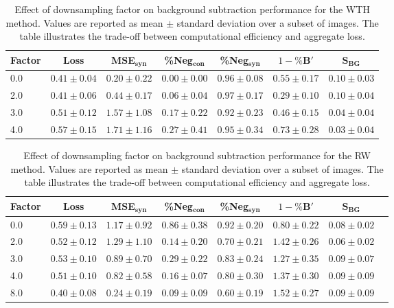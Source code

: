 \begin{table}[h]
\centering
\small
\begin{tabular}{lcccccc}
\hline
Factor & Loss & MSE$_{\mathbf{syn}}$ & \%Neg$_{\mathbf{con}}$ & \%Neg$_{\mathbf{syn}}$ & $1-\%\mathbf{B}'$ & $\mathbf{S}_{\mathbf{BG}}$ \\
\hline
0.0 & $0.41 \pm 0.04$ & $0.20 \pm 0.22$ & $0.00 \pm 0.00$ & $0.96 \pm 0.08$ & $0.55 \pm 0.17$ & $0.10 \pm 0.03$ \\
2.0 & $0.41 \pm 0.06$ & $0.44 \pm 0.17$ & $0.06 \pm 0.04$ & $0.97 \pm 0.17$ & $0.29 \pm 0.10$ & $0.10 \pm 0.04$ \\
3.0 & $0.51 \pm 0.12$ & $1.57 \pm 1.08$ & $0.17 \pm 0.22$ & $0.92 \pm 0.23$ & $0.46 \pm 0.15$ & $0.04 \pm 0.04$ \\
4.0 & $0.57 \pm 0.15$ & $1.71 \pm 1.16$ & $0.27 \pm 0.41$ & $0.95 \pm 0.34$ & $0.73 \pm 0.28$ & $0.03 \pm 0.04$ \\
\hline
\end{tabular}
\caption{Effect of downsampling factor on background subtraction performance for the WTH method. Values are reported as mean $\pm$ standard deviation over a subset of images. The table illustrates the trade-off between computational efficiency and aggregate loss.}
\label{tab:downsample_wth}
\end{table}

\begin{table}[h]
\centering
\small
\begin{tabular}{lccccccc}
\hline
Factor & Loss & MSE$_{\mathbf{syn}}$ & \%Neg$_{\mathbf{con}}$ & \%Neg$_{\mathbf{syn}}$ & $1-\%\mathbf{B}'$ & $\mathbf{S}_{\mathbf{BG}}$ \\
\hline
0.0 & $0.59 \pm 0.13$ & $1.17 \pm 0.92$ & $0.86 \pm 0.38$ & $0.92 \pm 0.20$ & $0.80 \pm 0.22$ & $0.08 \pm 0.02$ \\
2.0 & $0.52 \pm 0.12$ & $1.29 \pm 1.10$ & $0.14 \pm 0.20$ & $0.70 \pm 0.21$ & $1.42 \pm 0.26$ & $0.06 \pm 0.02$ \\
3.0 & $0.53 \pm 0.10$ & $0.89 \pm 0.70$ & $0.29 \pm 0.22$ & $0.83 \pm 0.24$ & $1.27 \pm 0.35$ & $0.09 \pm 0.07$ \\
4.0 & $0.51 \pm 0.10$ & $0.82 \pm 0.58$ & $0.16 \pm 0.07$ & $0.80 \pm 0.30$ & $1.37 \pm 0.30$ & $0.09 \pm 0.09$ \\
8.0 & $0.40 \pm 0.08$ & $0.24 \pm 0.19$ & $0.09 \pm 0.09$ & $0.60 \pm 0.19$ & $1.52 \pm 0.27$ & $0.09 \pm 0.09$ \\
\hline
\end{tabular}
\caption{Effect of downsampling factor on background subtraction performance for the RW method. Values are reported as mean $\pm$ standard deviation over a subset of images. The table illustrates the trade-off between computational efficiency and aggregate loss.}
\label{tab:downsample_rw}
\end{table}



